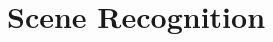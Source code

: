 \documentclass[xcolor=table,slidestop,compress,mathserif]{beamer}
\begin{document}
\section{Scene Recognition}
%
\end{document}
